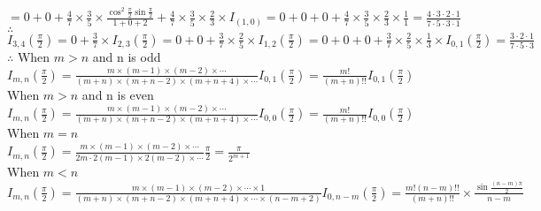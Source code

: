\documentclass{article}
\begin{document}
\hskip 2.465cm $\displaystyle = 0 + 0 + \frac{4}{7} \times \frac{3}{5} \times \frac{\cos^2{\frac{\pi}{2}} \sin{\frac{\pi}{2}}}{1+0+2} + \frac{4}{7} \times \frac{3}{5} \times \frac{2}{3} \times I_(1,0) = 0+0+0+\frac{4}{7} \times \frac{3}{5} \times \frac{2}{3} \times \frac{1}{1} = \frac{4 \cdot 3 \cdot 2 \cdot 1}{7 \cdot 5 \cdot 3 \cdot 1}$\\

$\therefore$ \qquad $\displaystyle I_{3,4}\left(\frac{\pi}{2}\right) = 0 + \frac{3}{7} \times I_{2,3}\left(\frac{\pi}{2}\right) = 0 + 0 + \frac{3}{7} \times \frac{2}{5} \times I_{1,2} \left(\frac{\pi}{2}\right) = 0 + 0 + 0 + \frac{3}{7} \times \frac{2}{5} \times \frac{1}{3} \times I_{0,1}\left(\frac{\pi}{2}\right) = \frac{3 \cdot 2 \cdot 1}{7 \cdot 5 \cdot 3}$\\

$\therefore$ \qquad When $m>n$ and n is odd\\ 

\hskip 1cm $\displaystyle I_{m,n}\left(\frac{\pi}{2}\right) = \frac{m \times (m-1) \times (m-2) \times \cdots}{(m+n) \times (m+n-2) \times (m+n+4) \times \cdots} I_{0,1} \left( \frac{\pi}{2} \right) = \frac{m!}{(m+n)!!} I_{0,1} \left( \frac{\pi}{2} \right)$\\

\hskip 1cm When $m>n$ and n is even\\

\hskip 1cm $\displaystyle I_{m,n}\left(\frac{\pi}{2}\right) = \frac{m \times (m-1) \times (m-2) \times \cdots}{(m+n) \times (m+n-2) \times (m+n+4) \times \cdots} I_{0,0} \left( \frac{\pi}{2} \right) = \frac{m!}{(m+n)!!} I_{0,0} \left( \frac{\pi}{2} \right)$\\

\hskip 1cm When $m=n$\\

\hskip 1cm $\displaystyle I_{m,n}\left(\frac{\pi}{2}\right) = \frac{m \times (m-1) \times (m-2) \times \cdots}{2m \cdot 2(m-1) \times 2(m-2) \times \cdots} \frac{\pi}{2} = \frac{\pi}{2^{m+1}}$\\

\hskip 1cm When $m<n$\\

\hskip 1cm $\displaystyle I_{m,n}\left(\frac{\pi}{2}\right) = \frac{m \times (m-1) \times (m-2) \times \cdots \times 1}{(m+n) \times (m+n-2) \times (m+n+4) \times \cdots \times (n - m + 2)} I_{0,n-m} \left(\frac{\pi}{2}\right) = \frac{m!(n-m)!!}{(m+n)!!} \times \frac{\sin{\frac{(n-m)\pi}{2}}}{n-m}$\\
\end{document}
